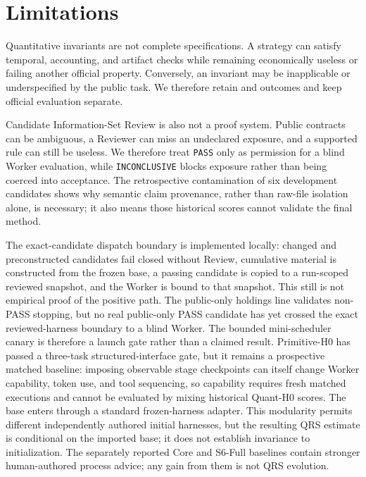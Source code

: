 \section{Limitations}

Quantitative invariants are not complete specifications. A strategy can satisfy
temporal, accounting, and artifact checks while remaining economically useless
or failing another official property. Conversely, an invariant may be
inapplicable or underspecified by the public task. We therefore retain \NA{} and
\Unknown{} outcomes and keep official evaluation separate.

Candidate Information-Set Review is also not a proof system. Public contracts
can be ambiguous, a Reviewer can miss an undeclared exposure, and a supported
rule can still be useless. We therefore treat \texttt{PASS} only as permission
for a blind Worker evaluation, while \texttt{INCONCLUSIVE} blocks exposure
rather than being coerced into acceptance. The retrospective contamination of
six development candidates shows why semantic claim provenance, rather than
raw-file isolation alone, is necessary; it also means those historical scores
cannot validate the final method.

The exact-candidate dispatch boundary is implemented locally: changed and
preconstructed candidates fail closed without Review, cumulative material is
constructed from the frozen base, a passing candidate is copied to a
run-scoped reviewed snapshot, and the Worker is bound to that snapshot. This
still is not empirical proof of the positive path. The public-only holdings
line validates non-PASS stopping, but no real public-only PASS candidate has
yet crossed the exact reviewed-harness boundary to a blind Worker. The bounded
mini-scheduler canary is therefore a launch gate rather than a claimed result.
Primitive-H0 has passed a three-task structured-interface gate, but it remains
a prospective matched baseline: imposing observable stage checkpoints can
itself change Worker capability, token use, and tool sequencing, so capability
requires fresh matched executions and cannot be evaluated by mixing historical
Quant-H0 scores. The base enters through a standard frozen-harness
adapter. This modularity permits different independently authored initial
harnesses, but the resulting QRS estimate is conditional on the imported base;
it does not establish invariance to initialization. The separately reported
Core and S6-Full baselines contain stronger human-authored process advice; any
gain from them is not QRS evolution.

